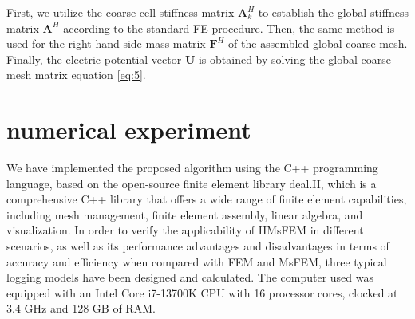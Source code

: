 \documentclass[manuscript,blind]{geophysics}
\begin{document}
First, we utilize the coarse cell stiffness matrix $\mathbf{A}_k^H$ to establish the global stiffness matrix $\mathbf{A}^H$ according to the standard FE procedure. Then, the same method is used for the right-hand side mass matrix $\mathbf{F}^H$ of the assembled global coarse mesh. Finally, the electric potential vector $\mathbf{U}$ is obtained by solving the global coarse mesh matrix equation \ref{eq:5}.

\section{numerical experiment}
We have implemented the proposed algorithm using the C++ programming language, based on the open-source finite element library deal.II, which is a comprehensive C++ library that offers a wide range of finite element capabilities, including mesh management, finite element assembly, linear algebra, and visualization. In order to verify the applicability of HMsFEM in different scenarios, as well as its performance advantages and disadvantages in terms of accuracy and efficiency when compared with FEM and MsFEM, three typical logging models have been designed and calculated. The computer used was equipped with an Intel Core i7-13700K CPU with 16 processor cores, clocked at 3.4 GHz and 128 GB of RAM.
\end{document}

